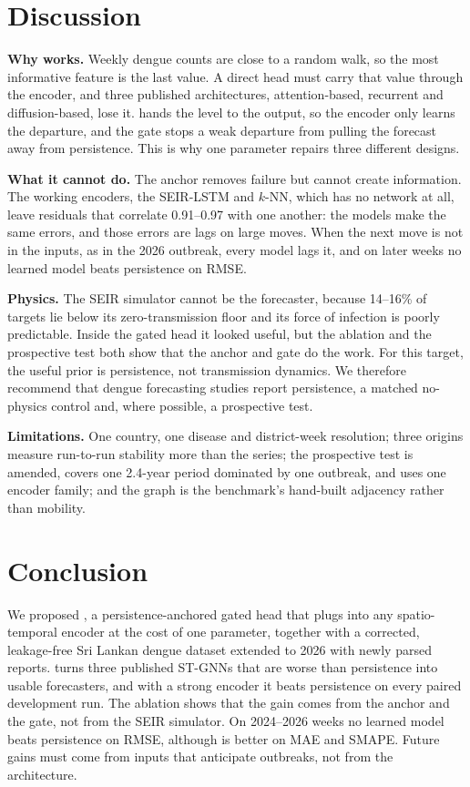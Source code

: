 \section{Discussion}
\label{sec:discussion}

\textbf{Why \model{} works.} Weekly dengue counts are close to a random walk, so the
most informative feature is the last value. A direct head must carry that value through
the encoder, and three published architectures, attention-based, recurrent and
diffusion-based, lose it. \model{} hands the level to the output, so the encoder only
learns the departure, and the gate stops a weak departure from pulling the forecast
away from persistence. This is why one parameter repairs three different designs.

\textbf{What it cannot do.} The anchor removes failure but cannot create information.
The working encoders, the SEIR-LSTM and $k$-NN, which has no network at all, leave
residuals that correlate 0.91--0.97 with one another: the models make the same errors,
and those errors are lags on large moves. When the next move is not in the inputs, as
in the 2026 outbreak, every model lags it, and on later weeks no learned model beats
persistence on RMSE.

\textbf{Physics.} The SEIR simulator cannot be the forecaster, because 14--16\% of
targets lie below its zero-transmission floor and its force of infection is poorly
predictable. Inside the gated head it looked useful, but the ablation and the
prospective test both show that the anchor and gate do the work. For this target, the
useful prior is persistence, not transmission dynamics. We therefore recommend that
dengue forecasting studies report persistence, a matched no-physics control and, where
possible, a prospective test.

\textbf{Limitations.} One country, one disease and district-week resolution; three
origins measure run-to-run stability more than the series; the prospective test is
amended, covers one 2.4-year period dominated by one outbreak, and uses one encoder
family; and the graph is the benchmark's hand-built adjacency rather than mobility.

\section{Conclusion}
We proposed \model{}, a persistence-anchored gated head that plugs into any
spatio-temporal encoder at the cost of one parameter, together with a corrected, leakage-free
Sri Lankan dengue dataset extended to 2026 with newly parsed reports. \model{}
turns three published ST-GNNs that are worse than persistence into usable forecasters,
and with a strong encoder it beats persistence on every paired development run. The
ablation shows that the gain comes from the anchor and the gate, not from the SEIR
simulator. On 2024--2026 weeks no learned model beats persistence on RMSE, although
\model{} is better on MAE and SMAPE. Future gains must come from inputs that anticipate
outbreaks, not from the architecture.

